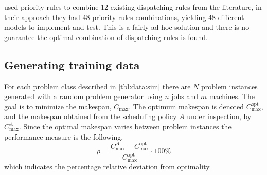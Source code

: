 \documentclass[smallextended]{svjour3}
\begin{document}
	\citet{Yu13} used priority rules to combine 12 existing dispatching rules from the literature, in their approach they had 48 priority rules combinations, yielding 48 different models to implement and test. This is a fairly ad-hoc solution and there is no guarantee the optimal combination of dispatching rules is found. 
	
	
	
	
	\subsection{Generating training data}\label{sec:gentrainingdata}
	For each problem class described in \cref{tbl:data:sim} there are $N$ problem instances generated  with a random problem generator using $n$ jobs and $m$ machines. 
	The goal is to minimize the makespan, $C_{\max}$. The optimum makespan is denoted $C_{\max}^{\text{opt}}$, and the makespan obtained from the scheduling policy $A$ under inspection, by $C_{\max}^{A}$. Since the optimal makespan varies between problem instances the performance measure is the following, 
	\begin{equation}\label{eq:ratio}\rho=\frac{C_{\max}^{A}-C_{\max}^{\text{opt}}}{C_{\max}^{\text{opt}}}\cdot 100\%\end{equation}
	which indicates the percentage relative deviation from optimality. %
	
\end{document}
